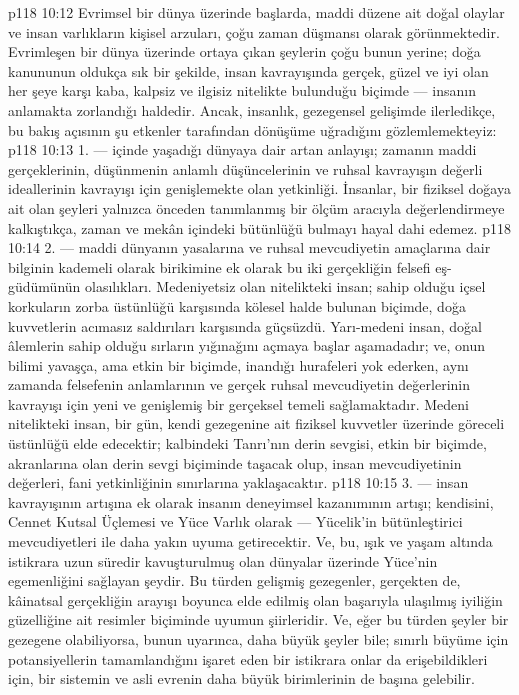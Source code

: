 \vs p118 10:12 Evrimsel bir dünya üzerinde başlarda, maddi düzene ait doğal olaylar ve insan varlıkların kişisel arzuları, çoğu zaman düşmansı olarak görünmektedir. Evrimleşen bir dünya üzerinde ortaya çıkan şeylerin çoğu bunun yerine; doğa kanununun oldukça sık bir şekilde, insan kavrayışında gerçek, güzel ve iyi olan her şeye karşı kaba, kalpsiz ve ilgisiz nitelikte bulunduğu biçimde --- insanın anlamakta zorlandığı haldedir. Ancak, insanlık, gezegensel gelişimde ilerledikçe, bu bakış açısının şu etkenler tarafından dönüşüme uğradığını gözlemlemekteyiz:
\vs p118 10:13 1. --- içinde yaşadığı dünyaya dair artan anlayışı; zamanın maddi gerçeklerinin, düşünmenin anlamlı düşüncelerinin ve ruhsal kavrayışın değerli ideallerinin kavrayışı için genişlemekte olan yetkinliği. İnsanlar, bir fiziksel doğaya ait olan şeyleri yalnızca önceden tanımlanmış bir ölçüm aracıyla değerlendirmeye kalkıştıkça, zaman ve mekân içindeki bütünlüğü bulmayı hayal dahi edemez.
\vs p118 10:14 2.\bibnobreakspace {} --- maddi dünyanın yasalarına ve ruhsal mevcudiyetin amaçlarına dair bilginin kademeli olarak birikimine ek olarak bu iki gerçekliğin felsefi eş\hyp{}güdümünün olasılıkları. Medeniyetsiz olan nitelikteki insan; sahip olduğu içsel korkuların zorba üstünlüğü karşısında kölesel halde bulunan biçimde, doğa kuvvetlerin acımasız saldırıları karşısında güçsüzdü. Yarı\hyp{}medeni insan, doğal âlemlerin sahip olduğu sırların yığınağını açmaya başlar aşamadadır; ve, onun bilimi yavaşça, ama etkin bir biçimde, inandığı hurafeleri yok ederken, aynı zamanda felsefenin anlamlarının ve gerçek ruhsal mevcudiyetin değerlerinin kavrayışı için yeni ve genişlemiş bir gerçeksel temeli sağlamaktadır. Medeni nitelikteki insan, bir gün, kendi gezegenine ait fiziksel kuvvetler üzerinde göreceli üstünlüğü elde edecektir; kalbindeki Tanrı’nın derin sevgisi, etkin bir biçimde, akranlarına olan derin sevgi biçiminde taşacak olup, insan mevcudiyetinin değerleri, fani yetkinliğinin sınırlarına yaklaşacaktır.
\vs p118 10:15 3. --- insan kavrayışının artışına ek olarak insanın deneyimsel kazanımının artışı; kendisini, Cennet Kutsal Üçlemesi ve Yüce Varlık olarak --- Yücelik’in bütünleştirici mevcudiyetleri ile daha yakın uyuma getirecektir. Ve, bu, ışık ve yaşam altında istikrara uzun süredir kavuşturulmuş olan dünyalar üzerinde Yüce’nin egemenliğini sağlayan şeydir. Bu türden gelişmiş gezegenler, gerçekten de, kâinatsal gerçekliğin arayışı boyunca elde edilmiş olan başarıyla ulaşılmış iyiliğin güzelliğine ait resimler biçiminde uyumun şiirleridir. Ve, eğer bu türden şeyler bir gezegene olabiliyorsa, bunun uyarınca, daha büyük şeyler bile; sınırlı büyüme için potansiyellerin tamamlandığını işaret eden bir istikrara onlar da erişebildikleri için, bir sistemin ve asli evrenin daha büyük birimlerinin de başına gelebilir.
